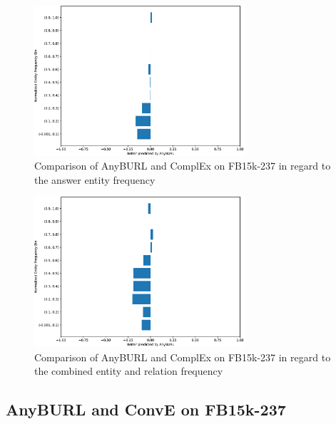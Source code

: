 \begin{figure}[H]
\centering
\includegraphics[width=0.7\textwidth]{images/entity_freq_answer_anyburl_complex_fb15k.PNG}
\caption{Comparison of AnyBURL and ComplEx on FB15k-237 in regard to the answer entity frequency}
\label{fig:entity_answer_tail_anyburl_complex_fb15k}
\end{figure}

\begin{figure}[H]
\centering
\includegraphics[width=0.7\textwidth]{images/combined_freq_anyburl_complex_fb15k.PNG}
\caption{Comparison of AnyBURL and ComplEx on FB15k-237 in regard to the combined entity and relation frequency}
\label{fig:combined_freq_anyburl_complex_fb15k}
\end{figure}





\subsection{AnyBURL and ConvE on FB15k-237}

